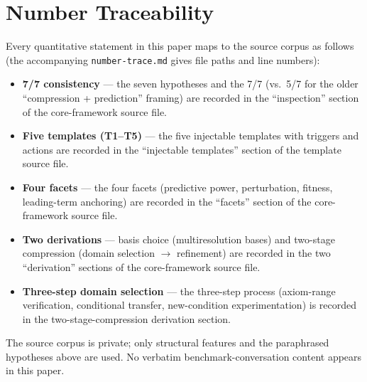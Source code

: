 \documentclass[11pt]{article}
\begin{document}
\section{Number Traceability}
\label{app:trace}

Every quantitative statement in this paper maps to the source corpus as follows
(the accompanying \texttt{number-trace.md} gives file paths and line numbers):

\begin{itemize}
\item \textbf{7/7 consistency} --- the seven hypotheses and the 7/7 (vs.\ 5/7
for the older ``compression + prediction'' framing) are recorded in the
``inspection'' section of the core-framework source file.
\item \textbf{Five templates (T1--T5)} --- the five injectable templates with
triggers and actions are recorded in the ``injectable templates'' section of the
template source file.
\item \textbf{Four facets} --- the four facets (predictive power, perturbation,
fitness, leading-term anchoring) are recorded in the ``facets'' section of the
core-framework source file.
\item \textbf{Two derivations} --- basis choice (multiresolution bases) and
two-stage compression (domain selection $\to$ refinement) are recorded in the
two ``derivation'' sections of the core-framework source file.
\item \textbf{Three-step domain selection} --- the three-step process
(axiom-range verification, conditional transfer, new-condition experimentation)
is recorded in the two-stage-compression derivation section.
\end{itemize}

The source corpus is private; only structural features and the paraphrased
hypotheses above are used. No verbatim benchmark-conversation content appears in
this paper.
\end{document}
